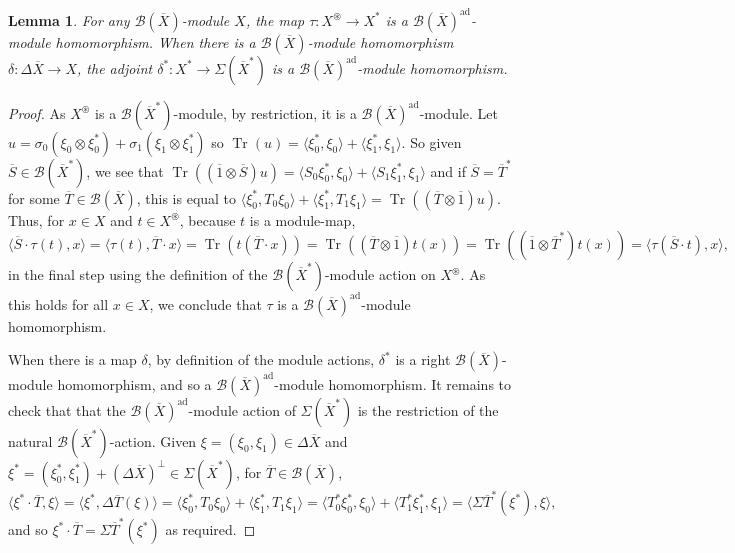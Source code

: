 \documentclass[a4paper,11pt]{article}
\theoremstyle{plain}
\newtheorem{lemma}[proposition]{Lemma}
\theoremstyle{remark}
\newcommand{\mc}[1]{\mathcal{#1}}
\newcommand{\ip}[2]{{\langle {#1} , {#2} \rangle}}
\newcommand{\intdual}{\circledast}
\newcommand{\tr}{\operatorname{Tr}}
\newcommand{\ad}{{\operatorname{ad}}}
\begin{document}
\begin{lemma}
For any $\mc B(\overline X)$-module $X$, the map $\tau \colon X^\intdual \to X^*$ is a $\mc B(\overline X)^\ad$-module homomorphism.  When there is a $\mc B(\overline X)$-module homomorphism $\delta \colon \Delta\overline X \to X$, the adjoint $\delta^* \colon X^* \to \Sigma(\overline X^*)$ is a $\mc B(\overline X)^\ad$-module homomorphism.
\end{lemma}
\begin{proof}
As $X^\intdual$ is a $\mc B(\overline X^*)$-module, by restriction, it is a $\mc B(\overline X)^\ad$-module.  Let $u = \sigma_0(\xi_0\otimes\xi_0^*) + \sigma_1(\xi_1\otimes\xi_1^*)$ so $\tr(u) = \ip{\xi_0^*}{\xi_0} + \ip{\xi_1^*}{\xi_1}$.  So given $\overline S \in\mc B(\overline X^*)$, we see that $\tr((\overline 1\otimes\overline S)u) = \ip{S_0\xi_0^*}{\xi_0} + \ip{S_1\xi_1^*}{\xi_1}$ and if $\overline S = \overline T^*$ for some $\overline T\in\mc B(\overline X)$, this is equal to $\ip{\xi_0^*}{T_0\xi_0} + \ip{\xi_1^*}{T_1\xi_1} = \tr((\overline T\otimes\overline 1)u)$.  Thus, for $x\in X$ and $t\in X^\intdual$, because $t$ is a module-map,
\[ \ip{\overline S \cdot \tau(t)}{x}
= \ip{\tau(t)}{\overline T\cdot x}
= \tr( t(\overline T\cdot x) )
= \tr((\overline T\otimes\overline 1)t(x))
= \tr((\overline 1\otimes\overline T^*)t(x))
= \ip{\tau(\overline S \cdot t)}{x}, \]
in the final step using the definition of the $\mc B(\overline X^*)$-module action on $X^\intdual$.  As this holds for all $x\in X$, we conclude that $\tau$ is a $\mc B(\overline X)^\ad$-module homomorphism.

When there is a map $\delta$, by definition of the module actions, $\delta^*$ is a right $\mc B(\overline X)$-module homomorphism, and so a $\mc B(\overline X)^\ad$-module homomorphism.  It remains to check that that the $\mc B(\overline X)^\ad$-module action of $\Sigma(\overline X^*)$ is the restriction of the natural $\mc B(\overline X^*)$-action.  Given $\xi=(\xi_0,\xi_1)\in\Delta\overline X$ and $\xi^* = (\xi_0^*, \xi_1^*) + (\Delta\overline X)^\perp \in \Sigma(\overline X^*)$, for $\overline T\in\mc B(\overline X)$,
\[ \ip{\xi^* \cdot \overline T}{\xi} = \ip{\xi^*}{\Delta\overline T(\xi)}
= \ip{\xi_0^*}{T_0\xi_0} + \ip{\xi_1^*}{T_1\xi_1}
= \ip{T_0^*\xi_0^*}{\xi_0} + \ip{T_1^*\xi_1^*}{\xi_1}
= \ip{\Sigma\overline T^*(\xi^*)}{\xi}, \]
and so $\xi^* \cdot \overline T = \Sigma\overline T^*(\xi^*)$ as required.
\end{proof}
\end{document}
